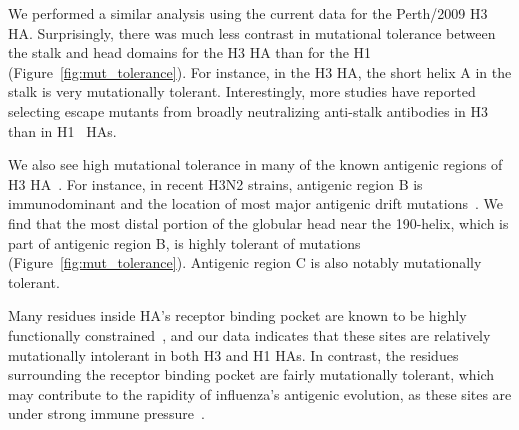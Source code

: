 \documentclass[9pt,twocolumn,twoside]{pnas-new}
\begin{document}
We performed a similar analysis using the current data for the Perth/2009 H3 HA.
Surprisingly, there was much less contrast in mutational tolerance between the stalk and head domains for the H3 HA than for the H1 (Figure~\ref{fig:mut_tolerance}).
For instance, in the H3 HA, the short helix A in the stalk is very mutationally tolerant.
Interestingly, more studies have reported selecting escape mutants from broadly neutralizing anti-stalk antibodies in H3~\cite{ekiert2011highly, friesen2014common, chai2016two, yamayoshi2017human} than in H1~\cite{okuno1993common,doud2017quantifying} HAs.

We also see high mutational tolerance in many of the known antigenic regions of H3 HA~\cite{wiley1981structural}.
For instance, in recent H3N2 strains, antigenic region B is immunodominant and the location of most major antigenic drift mutations~\cite{chambers2015identification,koel2013substitutions,popova2012immunodominance}.
We find that the most distal portion of the globular head near the 190-helix, which is part of antigenic region B, is highly tolerant of mutations (Figure~\ref{fig:mut_tolerance}).
Antigenic region C is also notably mutationally tolerant.

Many residues inside HA's receptor binding pocket are known to be highly functionally constrained~\cite{wilson1981structure,martin1998studies}, and our data indicates that these sites are relatively mutationally intolerant in both H3 and H1 HAs.
In contrast, the residues surrounding the receptor binding pocket are fairly mutationally tolerant, which may contribute to the rapidity of influenza's antigenic evolution, as these sites are under strong immune pressure~\cite{wiley1981structural,koel2013substitutions}.
\end{document}
